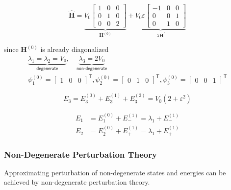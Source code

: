\begin{examplesection}
    \noindent\begin{equation*}
        \widehat{\mathbf{H}} = \underbrace{V_0 
        \begin{bmatrix}
            1&0&0\\
            0&1&0\\
            0&0&2
        \end{bmatrix}}_{\mathbf{H}^{(0)}}
        + \underbrace{V_0 \varepsilon
        \begin{bmatrix}
            -1&0&0\\
            0&0&1\\
            0&1&0
        \end{bmatrix}}_{\lambda\mathbf{H}^{\prime}}
    \end{equation*}

    since $\mathbf{H}^{(0)}$ is already diagonalized
    \noindent\begin{gather*}
        \underbrace{\lambda_1 = \lambda_2 = V_0}_{\textsf{degenerate}},\quad \underbrace{\lambda_3 = 2V_0}_{\textsf{non-degenerate}}\\
        \psi_1^{(0)} = \begin{bmatrix}
            1&0&0
        \end{bmatrix}^{\mathsf{T}},
        \psi_2^{(0)} = \begin{bmatrix}
            0&1&0
        \end{bmatrix}^{\mathsf{T}},
        \psi_3^{(0)} = \begin{bmatrix}
            0&0&1
        \end{bmatrix}^{\mathsf{T}}
    \end{gather*}

    \newpar{}
    \noindent\begin{equation*}
        E_3 = E_3^{(0)}+E_3^{(1)}+E_3^{(2)} = V_0(2+\varepsilon^2)
    \end{equation*}

    \noindent\begin{align*}
            E_1 &= E_1^{(0)} + E_{-}^{(1)} = \lambda_1+ E_{-}^{(1)} \\
            E_2 &= E_2^{(0)} + E_{+}^{(1)} = \lambda_1+ E_{+}^{(1)}
    \end{align*}
\end{examplesection}

\subsubsection{Non-Degenerate Perturbation Theory}
Approximating perturbation of non-degenerate states and energies can be achieved by non-degenerate perturbation theory.
\newpar{}

